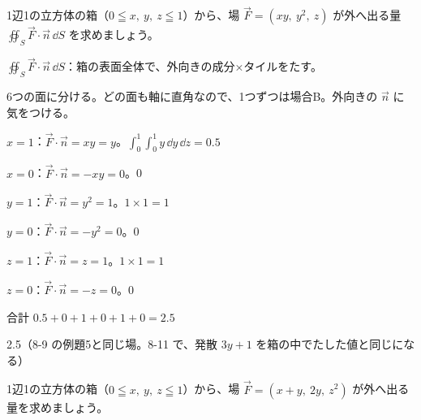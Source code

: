 \begin{reidai}[閉じた箱から出る量]
1辺1の立方体の箱（$0\leqq x,\ y,\ z\leqq1$）から、場 $\vec F=(xy,\ y^2,\ z)$ が外へ出る量 $\displaystyle\oiint_S\vec F\cdot\vec n\,\dd S$ を求めましょう。\par
\kangaekata {}\par
{}\enspace $\displaystyle\oiint_S\vec F\cdot\vec n\,\dd S$：箱の表面全体で、外向きの成分×タイルをたす。\par
{}\enspace 6つの面に分ける。どの面も軸に直角なので、1つずつは場合B。外向きの $\vec n$ に気をつける。\par
\shiki\kviiiis{}\zw{} $x=1$：$\vec F\cdot\vec n=xy=y$。$\displaystyle\int_0^1\!\!\int_0^1y\,\dd y\,\dd z=0.5$\par
\kviiiia $x=0$：$\vec F\cdot\vec n=-xy=0$。0\par
\kviiiia $y=1$：$\vec F\cdot\vec n=y^2=1$。$1\times1=1$\par
\kviiiia $y=0$：$\vec F\cdot\vec n=-y^2=0$。0\par
\kviiiia $z=1$：$\vec F\cdot\vec n=z=1$。$1\times1=1$\par
\kviiiia $z=0$：$\vec F\cdot\vec n=-z=0$。0\par
\kviiiia 合計 $0.5+0+1+0+1+0=2.5$\par
\kotae\kviiiis{}\zw{} 2.5（8-9 の例題5と同じ場。8-11 で、発散 $3y+1$ を箱の中でたした値と同じになる）
\end{reidai}

\begin{jibun}
1辺1の立方体の箱（$0\leqq x,\ y,\ z\leqq1$）から、場 $\vec F=(x+y,\ 2y,\ z^2)$ が外へ出る量を求めましょう。
\end{jibun}

